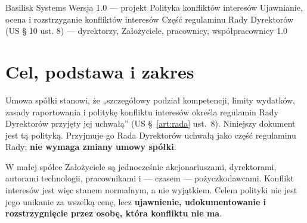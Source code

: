 \documentclass[11pt,a4paper]{report}
\newcommand{\US}[1]{US §~#1}
\begin{document}
\BusinessPlanTitlePage
  {Basilisk Systems}
  {Wersja 1.0 --- projekt}
  {Polityka konfliktów interesów}
  {Ujawnianie, ocena i rozstrzyganie konfliktów interesów}
  {Część regulaminu Rady Dyrektorów (US § 10 ust. 8) --- dyrektorzy, Założyciele, pracownicy, współpracownicy}
  {1.0}

\tableofcontents
\newpage

\section{Cel, podstawa i zakres}

Umowa spółki stanowi, że „szczegółowy podział kompetencji, limity wydatków, zasady raportowania i politykę konfliktu interesów określa regulamin Rady Dyrektorów przyjęty jej uchwałą” (\US{\ref{art:rada} ust.~8}). Niniejszy dokument jest tą polityką. Przyjmuje go Rada Dyrektorów uchwałą jako część regulaminu Rady; \textbf{nie wymaga zmiany umowy spółki}.

W małej spółce Założyciele są jednocześnie akcjonariuszami, dyrektorami, autorami technologii, pracownikami i --- czasem --- pożyczkodawcami. Konflikt interesów jest więc stanem normalnym, a nie wyjątkiem. Celem polityki nie jest jego unikanie za wszelką cenę, lecz \textbf{ujawnienie, udokumentowanie i rozstrzygnięcie przez osobę, która konfliktu nie ma}.
\end{document}
